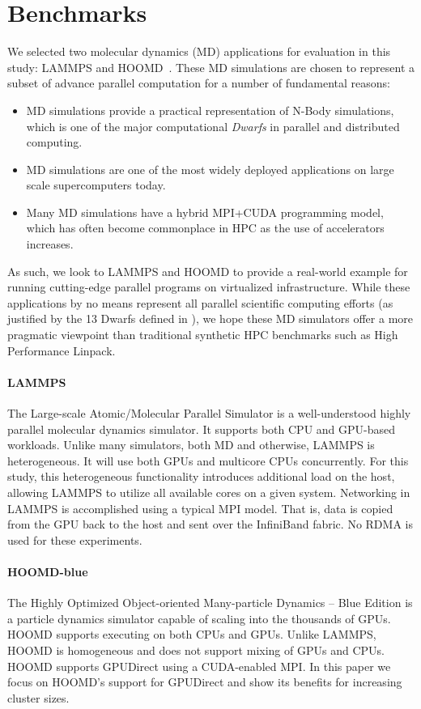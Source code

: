 \section{Benchmarks}
We selected two molecular dynamics (MD) applications for evaluation in this study:
LAMMPS and HOOMD~\cite{plimpton2007lammps,anderson2010hoomd}.  These MD simulations are chosen to represent a subset of advance parallel computation for a number of fundamental reasons:

\begin{itemize}
\item MD simulations provide a practical representation of N-Body simulations, which is one of the major computational \emph{Dwarfs} \cite{asanovic2006landscape} in parallel and distributed computing. 
\item MD simulations are one of the most widely deployed applications on large scale supercomputers today.
\item Many MD simulations have a hybrid MPI+CUDA programming model, which has often become commonplace in HPC as the use of accelerators increases.
\end{itemize}

As such, we look to LAMMPS and HOOMD to provide a real-world example for running cutting-edge parallel programs on virtualized infrastructure. While these applications by no means represent all parallel scientific computing efforts (as justified by the 13 Dwarfs defined in \cite{asanovic2006landscape}), we hope these MD simulators offer a more pragmatic viewpoint than traditional synthetic HPC benchmarks such as High Performance Linpack. 

\paragraph {LAMMPS} The Large-scale Atomic/Molecular Parallel Simulator is a
well-understood highly parallel molecular dynamics simulator.  It supports both
CPU and GPU-based workloads.  Unlike many simulators, both MD and otherwise,
LAMMPS is heterogeneous.  It will use both GPUs and multicore CPUs concurrently.
For this study, this heterogeneous functionality introduces additional load on
the host, allowing LAMMPS to utilize all available cores on a given system.
Networking in LAMMPS is accomplished using a typical MPI model. That is, data is
copied from the GPU back to the host and sent over the InfiniBand fabric.  No
RDMA is used for these experiments.  

\paragraph{HOOMD-blue} The Highly Optimized Object-oriented Many-particle
Dynamics -- Blue Edition is a particle dynamics simulator capable of
scaling into the thousands of GPUs.  HOOMD supports executing on both CPUs and
GPUs.  Unlike LAMMPS, HOOMD is homogeneous and does not support mixing
of GPUs and CPUs.  HOOMD supports GPUDirect using a CUDA-enabled MPI.
In this paper we focus on HOOMD's
support for GPUDirect and show its benefits for increasing cluster sizes.  




